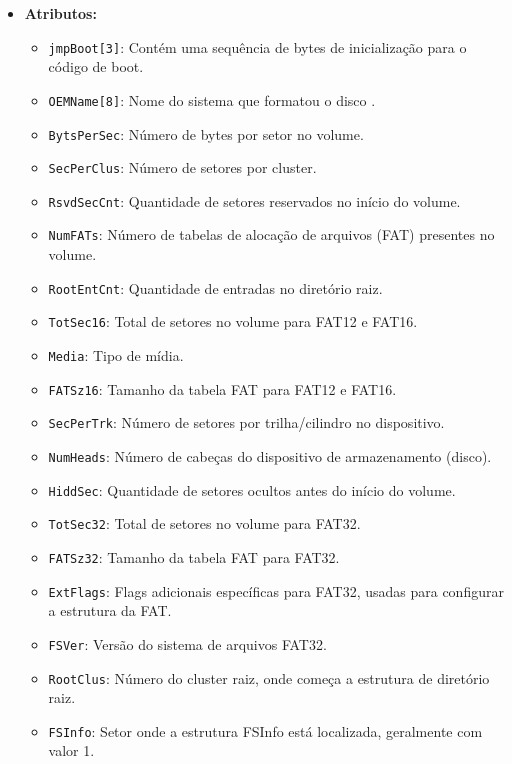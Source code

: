 \documentclass[
    12pt,				%
    oneside,   	        %
    a4paper,			%
    english,			%
    french,				%
    spanish,			%
    brazil,				%
    ]{pacotes/abntex2}
\begin{document}
\begin{itemize}
    \item \textbf{Atributos:}
        \begin{itemize}
            \item \texttt{jmpBoot[3]}: Contém uma sequência de bytes de inicialização para o código de boot.
            \item \texttt{OEMName[8]}: Nome do sistema que formatou o disco .
            \item \texttt{BytsPerSec}: Número de bytes por setor no volume.
            \item \texttt{SecPerClus}: Número de setores por cluster.
            \item \texttt{RsvdSecCnt}: Quantidade de setores reservados no início do volume.
            \item \texttt{NumFATs}: Número de tabelas de alocação de arquivos (FAT) presentes no volume.
            \item \texttt{RootEntCnt}: Quantidade de entradas no diretório raiz.
            \item \texttt{TotSec16}: Total de setores no volume para FAT12 e FAT16.
            \item \texttt{Media}: Tipo de mídia.
            \item \texttt{FATSz16}: Tamanho da tabela FAT para FAT12 e FAT16.
            \item \texttt{SecPerTrk}: Número de setores por trilha/cilindro no dispositivo.
            \item \texttt{NumHeads}: Número de cabeças do dispositivo de armazenamento (disco).
            \item \texttt{HiddSec}: Quantidade de setores ocultos antes do início do volume.
            \item \texttt{TotSec32}: Total de setores no volume para FAT32.
            \item \texttt{FATSz32}: Tamanho da tabela FAT para FAT32.
            \item \texttt{ExtFlags}: Flags adicionais específicas para FAT32, usadas para configurar a estrutura da FAT.
            \item \texttt{FSVer}: Versão do sistema de arquivos FAT32.
            \item \texttt{RootClus}: Número do cluster raiz, onde começa a estrutura de diretório raiz.
            \item \texttt{FSInfo}: Setor onde a estrutura FSInfo está localizada, geralmente com valor 1.

\end{itemize}
\end{itemize}
\end{document}

